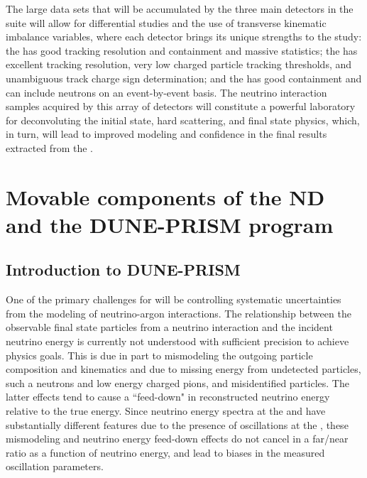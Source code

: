 The large data sets that will be accumulated by the three main detectors in the   suite will allow for differential studies and the use of transverse kinematic imbalance variables, where each detector brings its unique strengths to the study: the  has good tracking resolution and containment and massive statistics; the  has excellent tracking resolution, very low charged particle tracking thresholds, and unambiguous track charge sign determination; and the  has good containment and can include neutrons on an event-by-event basis. The neutrino interaction samples acquired by this array of detectors will constitute a powerful laboratory for deconvoluting the initial state, hard scattering, and final state physics, which, in turn, will lead to improved modeling and confidence in the final results extracted from the  .  




\section{Movable components of the ND and the DUNE-PRISM program}
\label{sec:exsum-nd-movable}

\subsection{Introduction to DUNE-PRISM}

One of the primary challenges for  will be controlling systematic uncertainties from the modeling of neutrino-argon interactions. The relationship between the observable final state particles from a neutrino interaction and the incident neutrino energy is currently not understood with sufficient precision to achieve  physics goals.  This is due in part to mismodeling the outgoing particle composition and kinematics and due to missing energy from undetected particles, such a neutrons and low energy charged pions, and misidentified particles. The latter effects tend to cause  a ``feed-down" in reconstructed neutrino energy relative to the true energy. Since neutrino energy spectra at the  and  have substantially different features due to the presence of oscillations at the  , these mismodeling and neutrino energy feed-down effects do not cancel in a far/near ratio as a function of neutrino energy, and lead to biases in the measured oscillation parameters.

